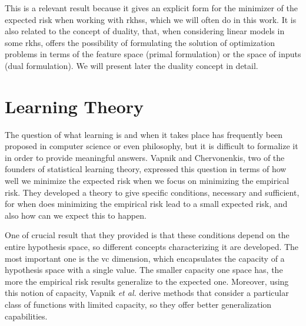 This is a relevant result because it gives an explicit form for the minimizer of the expected risk when working with \acrshort{rkhss}, which we will often do in this work. It is also related to the concept of duality, that, when considering linear models in some \acrshort{rkhs}, offers the possibility of formulating the solution of optimization problems in terms of the feature space (primal formulation) or the space of inputs (dual formulation). We will present later the duality concept in detail. 



















\section{Learning Theory}\label{sec:learning_theory}
% 
%




The question of what learning is and when it takes place has frequently been proposed in computer science or even philosophy, but it is difficult to formalize it in order to provide meaningful answers. Vapnik and Chervonenkis, two of the founders of statistical learning theory, expressed this question in terms of how well we minimize the expected risk when we focus on minimizing the empirical risk.
%
They developed a theory to give specific conditions, necessary and sufficient, for when does minimizing the empirical risk lead to a small expected risk, and also how can we expect this to happen.

%
One of crucial result that they provided is that these conditions depend on the entire hypothesis space, so different concepts characterizing it are developed. The most important one is the \acrfull{vc} dimension, which encapsulates the capacity of a hypothesis space with a single value. The smaller capacity one space has, the more the empirical risk results generalize to the expected one.
%
Moreover, using this notion of capacity, Vapnik \emph{et al.} derive methods that consider a particular class of functions with limited capacity, so they offer better generalization capabilities.


